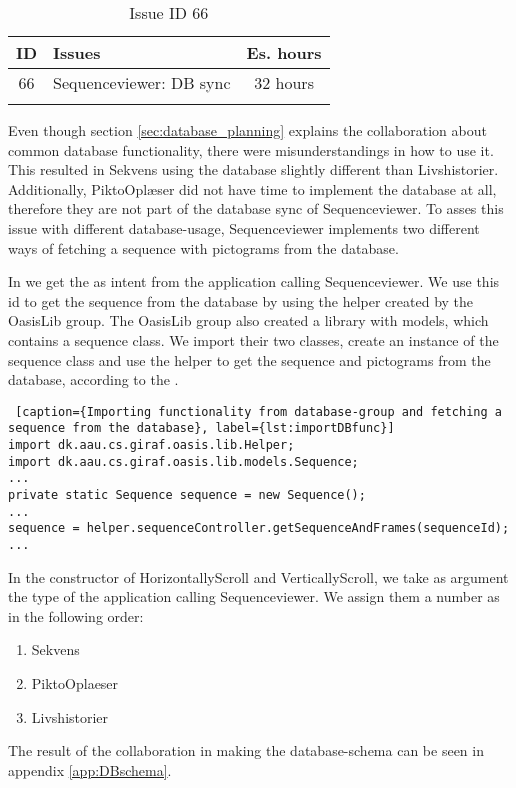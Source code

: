 \begin{longtable} { | c | p{12cm} | c | } 
\hline
	ID 	&	Issues	&		 Es. hours \\\hline
	 66	&	Sequenceviewer: DB sync	&	32 hours \\\hline
\caption{Issue ID 66}
\label{tab:spr4_SVdbSync}
\end{longtable}

Even though section \ref{sec:database_planning} explains the collaboration about common database functionality, there were misunderstandings in how to use it. This resulted in Sekvens using the database slightly different than Livshistorier. Additionally, PiktoOplæser did not have time to implement the database at all, therefore they are not part of the database sync of Sequenceviewer. To asses this issue with different database-usage, Sequenceviewer implements two different ways of fetching a sequence with pictograms from the database. 

In  we get the  as intent from the application calling Sequenceviewer. We use this id to get the sequence from the database by using the helper created by the OasisLib group. The OasisLib group also created a library with models, which contains a sequence class. We import their two classes, create an instance of the sequence class and use the helper to get the sequence and pictograms from the database, according to the .

\begin{lstlisting} [caption={Importing functionality from database-group and fetching a sequence from the database}, label={lst:importDBfunc}]
import dk.aau.cs.giraf.oasis.lib.Helper;
import dk.aau.cs.giraf.oasis.lib.models.Sequence;
...
private static Sequence sequence = new Sequence();
...
sequence = helper.sequenceController.getSequenceAndFrames(sequenceId);
...
\end{lstlisting}

In the constructor of HorizontallyScroll and VerticallyScroll, we take as argument the type of the application calling Sequenceviewer. We assign them a number as in the following order:
\begin{enumerate}
\item Sekvens
\item PiktoOplaeser
\item Livshistorier
\end{enumerate}

The result of the collaboration in making the database-schema can be seen in appendix \ref{app:DBschema}. 

